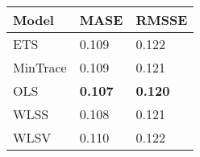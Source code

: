 
\begin{tabular}{lll}

Model & MASE & RMSSE\\
\midrule
ETS & 0.109 & 0.122\\
MinTrace & 0.109 & 0.121\\
OLS & \textbf{0.107} & \textbf{0.120}\\
WLSS & 0.108 & 0.121\\
WLSV & 0.110 & 0.122\\

\end{tabular}